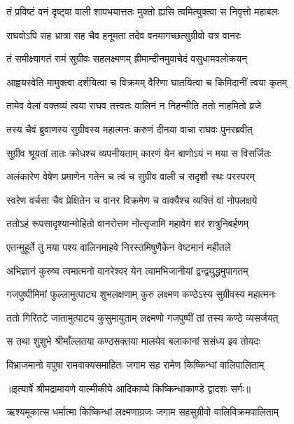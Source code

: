 \twolineshloka
{तं प्रविष्टं वनं दृष्ट्वा वाली शापभयात्ततः}
{मुक्तो ह्यसि त्वमित्युक्त्वा स निवृत्तो महाबलः} %

\twolineshloka
{राघवोऽपि सह भ्रात्रा सह चैव हनूमता}
{तदेव वनमागच्छत्सुग्रीवो यत्र वानरः} %

\twolineshloka
{तं समीक्ष्यागतं रामं सुग्रीवः सहलक्ष्मणम्}
{ह्रीमान्दीनमुवाचेदं वसुधामवलोकयन्} %

\twolineshloka
{आह्वयस्वेति मामुक्त्वा दर्शयित्वा च विक्रमम्}
{वैरिणा घातयित्वा च किमिदानीं त्वया कृतम्} %

\twolineshloka
{तामेव वेलां वक्तव्यं त्वया राघव तत्त्वतः}
{वालिनं न निहन्मीति ततो नाहमितो व्रजे} %

\twolineshloka
{तस्य चैवं ब्रुवाणस्य सुग्रीवस्य महात्मनः}
{करुणं दीनया वाचा राघवः पुनरब्रवीत्} %

\twolineshloka
{सुग्रीव श्रूयतां तातः क्रोधश्च व्यपनीयताम्}
{कारणं येन बाणोऽयं न मया स विसर्जितः} %

\twolineshloka
{अलंकारेण वेषेण प्रमाणेन गतेन च}
{त्वं च सुग्रीव वाली च सदृशौ स्थः परस्परम्} %

\twolineshloka
{स्वरेण वर्चसा चैव प्रेक्षितेन च वानर}
{विक्रमेण च वाक्यैश्च व्यक्तिं वां नोपलक्षये} %

\twolineshloka
{ततोऽहं रूपसादृश्यान्मोहितो वानरोत्तम}
{नोत्सृजामि महावेगं शरं शत्रुनिबर्हणम्} %

\twolineshloka
{एतन्मुहूर्ते तु मया पश्य वालिनमाहवे}
{निरस्तमिषुणैकेन वेष्टमानं महीतले} %

\twolineshloka
{अभिज्ञानं कुरुष्व त्वमात्मनो वानरेश्वर}
{येन त्वामभिजानीयां द्वन्द्वयुद्धमुपागतम्} %

\twolineshloka
{गजपुष्पीमिमां फुल्लामुत्पाट्य शुभलक्षणाम्}
{कुरु लक्ष्मण कण्ठेऽस्य सुग्रीवस्य महात्मनः} %

\twolineshloka
{ततो गिरितटे जातामुत्पाट्य कुसुमायुताम्}
{लक्ष्मणो गजपुष्पीं तां तस्य कण्ठे व्यसर्जयत्} %

\twolineshloka
{स तथा शुशुभे श्रीमाँल्लतया कण्ठसक्तया}
{मालयेव बलाकानां ससंध्य इव तोयदः} %

\twolineshloka
{विभ्राजमानो वपुषा रामवाक्यसमाहितः}
{जगाम सह रामेण किष्किन्धां वालिपालिताम्} %


{॥इत्यार्षे श्रीमद्रामायणे वाल्मीकीये आदिकाव्ये किष्किन्धाकाण्डे द्वादशः सर्गः॥}


\twolineshloka
{ऋश्यमूकात्स धर्मात्मा किष्किन्धां लक्ष्मणाग्रजः}
{जगाम सहसुग्रीवो वालिविक्रमपालिताम्} %

